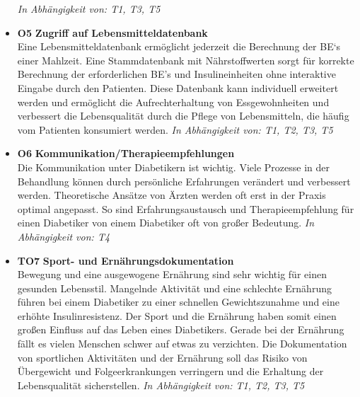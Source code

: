\begin{itemize}
	\emph{In Abhängigkeit von: T1, T3, T5} 
	\item \lbrack \textbf{O5}\rbrack  \textbf{ Zugriff auf Lebensmitteldatenbank} \\
	Eine Lebensmitteldatenbank ermöglicht jederzeit die Berechnung der BE‘s einer Mahlzeit. Eine  Stammdatenbank  mit Nährstoffwerten sorgt für korrekte Berechnung der erforderlichen BE’s und Insulineinheiten ohne  interaktive Eingabe durch den Patienten. Diese Datenbank kann individuell erweitert werden und ermöglicht die Aufrechterhaltung von Essgewohnheiten und verbessert die Lebensqualität durch die Pflege von Lebensmitteln, die häufig vom Patienten konsumiert werden.\newline
	\emph{In Abhängigkeit von: T1, T2, T3, T5} 
	\item \lbrack \textbf{O6}\rbrack  \textbf{ Kommunikation/Therapieempfehlungen} \\
	Die Kommunikation unter Diabetikern ist wichtig. Viele Prozesse in der Behandlung können durch persönliche Erfahrungen verändert und verbessert werden. Theoretische Ansätze von Ärzten werden oft erst in der Praxis optimal angepasst. So sind Erfahrungsaustausch und Therapieempfehlung für einen Diabetiker von einem Diabetiker oft von großer Bedeutung. \newline
	\emph{In Abhängigkeit von: T4} 
	\item \lbrack \textbf{TO7}\rbrack  \textbf{ Sport- und Ernährungsdokumentation} \\
	Bewegung und eine ausgewogene Ernährung sind sehr wichtig für einen gesunden Lebensstil. Mangelnde Aktivität und eine schlechte Ernährung führen bei einem Diabetiker zu einer schnellen Gewichtszunahme und eine erhöhte Insulinresistenz. Der Sport und die Ernährung haben somit einen großen Einfluss auf das Leben eines Diabetikers. Gerade bei der Ernährung fällt es vielen Menschen schwer auf etwas zu verzichten. Die Dokumentation von sportlichen Aktivitäten und der Ernährung soll das Risiko von Übergewicht und Folgeerkrankungen verringern und die Erhaltung der Lebensqualität sicherstellen.\newline
	\emph{In Abhängigkeit von: T1, T2, T3, T5} 
\end{itemize}